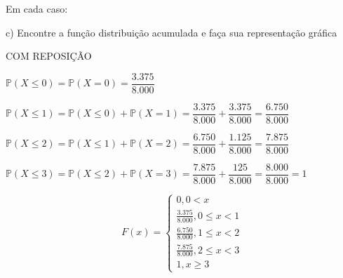 \documentclass[12pt,a4paper]{article}
\begin{document}
\vspace{1cm}
Em cada caso:

c) Encontre a função distribuição acumulada e faça sua representação gráfica

\vspace{0.25cm}
COM REPOSIÇÃO
\begin{center}
	\vspace{0.25cm}
	$\mathbb{P}(X\leq{0}) = \mathbb{P}(X=0) = \dfrac{3.375}{8.000}$
	
	\vspace{0.5cm}
	$\mathbb{P}(X\leq1) = \mathbb{P}(X\leq{0}) + \mathbb{P}(X=1) = \dfrac{3.375}{8.000} + \dfrac{3.375}{8.000} = \dfrac{6.750}{8.000}$
	
	\vspace{0.5cm}
	$\mathbb{P}(X\leq{2}) = \mathbb{P}(X\leq1) + \mathbb{P}(X=2) = \dfrac{6.750}{8.000} + \dfrac{1.125}{8.000} = \dfrac{7.875}{8.000}$
	
	\vspace{0.5cm}
	$\mathbb{P}(X\leq{3}) = \mathbb{P}(X\leq{2}) + \mathbb{P}(X=3) = \dfrac{7.875}{8.000} + \dfrac{125}{8.000} = \dfrac{8.000}{8.000} = 1$
	
	\[
	F(x) =
	\begin{cases}
	0, 0 < x \\
	\frac{3.375}{8.000}, 0\leq{x} < 1 \\
	\frac{6.750}{8.000}, 1\leq{x} < 2\\
	\frac{7.875}{8.000}, 2\leq{x} < 3\\
	1,x\geq{3}
	\end{cases}
	\]
	
	\vspace{1cm}
	
\end{center}
\end{document}
